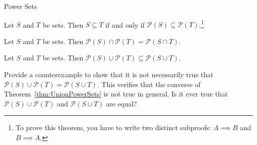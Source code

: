 \begin{section}{Power Sets}
\begin{theorem}
Let $S$ and $T$ be sets.  Then $S\subseteq T$ if and only if $\mathcal{P}(S)\subseteq \mathcal{P}(T)$.\footnote{To prove this theorem, you have to write two distinct subproofs: $A\implies B$ and $B\implies A$.}
\end{theorem}

\begin{theorem}
Let $S$ and $T$ be sets.  Then $\mathcal{P}(S)\cap\mathcal{P}(T)=\mathcal{P}(S\cap T)$.
\end{theorem}

\begin{theorem}\label{thm:UnionPowerSets}
Let $S$ and $T$ be sets.  Then $\mathcal{P}(S)\cup\mathcal{P}(T)\subseteq \mathcal{P}(S\cup T)$.
\end{theorem}

\begin{problem}
Provide a counterexample to show that it is not necessarily true that $\mathcal{P}(S)\cup\mathcal{P}(T)= \mathcal{P}(S\cup T)$. This verifies that the converse of Theorem~\ref{thm:UnionPowerSets} is not true in general. Is it ever true that $\mathcal{P}(S)\cup\mathcal{P}(T)$ and  $\mathcal{P}(S\cup T)$ are equal?
\end{problem}

\end{section}